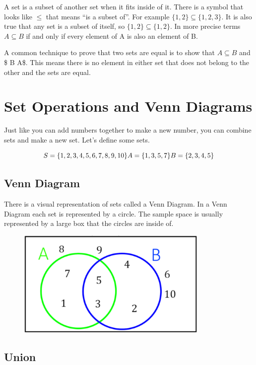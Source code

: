 \documentclass[]{book}
\begin{document}
A set is a subset of another set when it fits inside of it. There is a
symbol that looks like \(\leq\) that means ``is a subset of''. For
example \(\{1,2\} \subseteq \{1,2,3\}\). It is also true that any set is
a subset of itself, so \(\{1,2\} \subseteq \{1,2\}\). In more precise
terms \(A \subseteq B\) if and only if every element of A is also an
element of B.

A common technique to prove that two sets are equal is to show that
\(A \subseteq B\) and \$ B \subseteq A\$. This means there is no element
in either set that does not belong to the other and the sets are equal.

\section{Set Operations and Venn
Diagrams}\label{set-operations-and-venn-diagrams}

Just like you can add numbers together to make a new number, you can
combine sets and make a new set. Let's define some sets.

\[S = \{1,2,3,4,5,6,7,8,9,10\} \\
 A = \{1,3,5,7\} \\
 B = \{2,3,4,5\}\]

\subsection{Venn Diagram}\label{venn-diagram}

There is a visual representation of sets called a Venn Diagram. In a
Venn Diagram each set is represented by a circle. The sample space is
usually represented by a large box that the circles are inside of.

\begin{figure}
\centering
\includegraphics{Pictures/01-Sets/Venn.PNG}
\caption{}
\end{figure}

\subsection{Union}\label{union}
\end{document}
